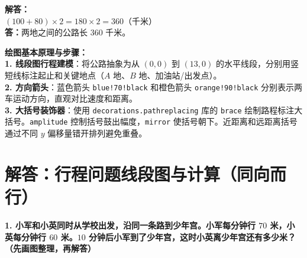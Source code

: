 \vspace{0.6cm}

\noindent
\textbf{解答：}\\
$(100 + 80) \times 2 = 180 \times 2 = 360$（千米）\\[4pt]
\textbf{答：}两地之间的公路长 $360$ 千米。

\vspace{0.6cm}

{\small\color{blue!70!black}
\textbf{绘图基本原理与步骤：}\\
\textbf{1. 线段图行程建模}：将公路抽象为从 $(0,0)$ 到 $(13,0)$ 的水平线段，分别用竖短线标注起止和关键地点（$A$ 地、$B$ 地、加油站/出发点）。\\
\textbf{2. 方向箭头}：蓝色箭头 \texttt{blue!70!black} 和橙色箭头 \texttt{orange!90!black} 分别表示两车运动方向，直观对比速度和距离。\\
\textbf{3. 大括号装饰器}：使用 \texttt{decorations.pathreplacing} 库的 \texttt{brace} 绘制路程标注大括号。\texttt{amplitude} 控制括号鼓出幅度，\texttt{mirror} 使括号朝下。近距离和远距离括号通过不同 $y$ 偏移量错开排列避免重叠。
}

\newpage



\newpage

\section{解答：行程问题线段图与计算（同向而行）}

\vspace{0.4cm}

\noindent\textbf{1. 小军和小英同时从学校出发，沿同一条路到少年宫。小军每分钟行 $70$ 米，小英每分钟行 $60$ 米。$10$ 分钟后小军到了少年宫，这时小英离少年宫还有多少米？（先画图整理，再解答）}

\vspace{0.8cm}

